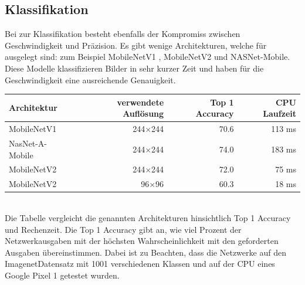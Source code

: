 \documentclass[12pt,a4paper,ngerman,enabledeprecatedfontcommands]{scrreprt}
\begin{document}
\subsection{Klassifikation}
Bei  zur \gls{Klassifikation} besteht ebenfalls der Kompromiss zwischen Geschwindigkeit und Präzision. Es gibt wenige Architekturen, welche für  ausgelegt sind: zum Beispiel MobileNetV1\cite{DBLP:journals/corr/HowardZCKWWAA17} , MobileNetV2\cite{DBLP:journals/corr/abs-1801-04381}  und NASNet-Mobile. Diese Modelle klassifizieren Bilder in sehr kurzer Zeit und haben für die Geschwindigkeit eine ausreichende Genauigkeit.\\

\begin{tabu}{|X[l]|r|r|r|}
\hline
Architektur & verwendete Auflösung & Top 1 Accuracy & CPU Laufzeit \\
\hline
MobileNetV1\cite{DBLP:journals/corr/HowardZCKWWAA17}    & 244$\times$244 & 70.6 & 113 ms \\
NasNet-A-Mobile & 244$\times$244 & 74.0 & 183 ms \\
MobileNetV2\cite{DBLP:journals/corr/abs-1801-04381}    & 244$\times$244 & 72.0 & 75 ms \\
MobileNetV2\cite{DBLP:journals/corr/abs-1801-04381}  &  96$\times$96\footnotemark[8] & 60.3 & 18 ms \\
\hline  
\end{tabu}~\\
Die Tabelle vergleicht die genannten Architekturen hinsichtlich Top 1 Accuracy und Rechenzeit. Die Top 1 Accuracy gibt an, wie viel Prozent der Netzwerkausgaben mit der höchsten Wahrscheinlichkeit mit den geforderten Ausgaben übereinstimmen. Dabei ist zu Beachten, dass die Netzwerke auf den Imagenet\footnotemark[9] Datensatz mit 1001 verschiedenen Klassen und auf der CPU eines Google Pixel 1 getestet wurden.\\

\end{document}
